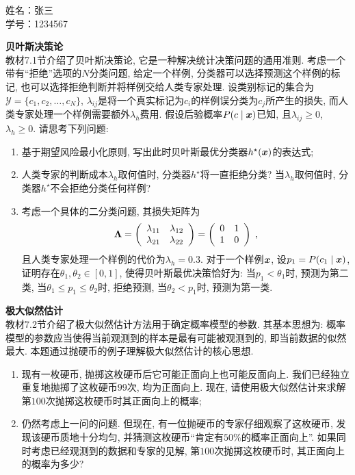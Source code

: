 \documentclass[answers]{exam}  %
\begin{document}
\noindent 
姓名：张三 \\
学号：1234567 \\
\begin{questions}
\question [20] \textbf{贝叶斯决策论} \\
教材7.1节介绍了贝叶斯决策论, 它是一种解决统计决策问题的通用准则. 考虑一个带有“拒绝”选项的$N$分类问题, 给定一个样例, 分类器可以选择预测这个样例的标记, 也可以选择拒绝判断并将样例交给人类专家处理. 设类别标记的集合为$\mathcal{Y}=\{c_1,c_2,\ldots,c_N\}$, $\lambda_{ij}$是将一个真实标记为$c_i$的样例误分类为$c_j$所产生的损失, 而人类专家处理一个样例需要额外$\lambda_{h}$费用. 假设后验概率$P(c\mid{\boldsymbol{x}})$已知, 且$\lambda_{ij}\geq 0$, $\lambda_{h}\geq 0$. 请思考下列问题:
\begin{enumerate}
	\item 基于期望风险最小化原则, 写出此时贝叶斯最优分类器$h^\star({\boldsymbol{x}})$的表达式;
	\item 人类专家的判断成本$\lambda_{h}$取何值时, 分类器$h^\star$将一直拒绝分类? 当$\lambda_{h}$取何值时, 分类器$h^\star$不会拒绝分类任何样例?
	\item 考虑一个具体的二分类问题, 其损失矩阵为
	\begin{equation}
		\boldsymbol{\Lambda}=\left(\begin{array}{cc}
			\lambda_{11} & \lambda_{12} \\
			\lambda_{21} & \lambda_{22} \end{array}\right)=\left(\begin{array}{cc}
			0 & 1 \\
			1 & 0 \end{array}\right)\;,
	\label{ch7_eq:cost_matrix}
	\end{equation}
	且人类专家处理一个样例的代价为$\lambda_{h}=0.3$. 对于一个样例${\boldsymbol{x}}$, 设$p_1=P(c_1\mid{\boldsymbol{x}})$, 证明存在$\theta_1,\theta_2\in[0,1]$, 使得贝叶斯最优决策恰好为: 当$p_1<\theta_1$时, 预测为第二类, 当$\theta_1\leq p_1\leq \theta_2$时, 拒绝预测, 当$\theta_2<p_1$时, 预测为第一类.
\end{enumerate}

\begin{solution}
\end{solution}

\question [20] \textbf{极大似然估计} \\
教材7.2节介绍了极大似然估计方法用于确定概率模型的参数. 其基本思想为: 概率模型的参数应当使得当前观测到的样本是最有可能被观测到的, 即当前数据的似然最大. 本题通过抛硬币的例子理解极大似然估计的核心思想. 
\begin{enumerate}
	\item 现有一枚硬币, 抛掷这枚硬币后它可能正面向上也可能反面向上. 我们已经独立重复地抛掷了这枚硬币$99$次, 均为正面向上. 现在, 请使用极大似然估计来求解第$100$次抛掷这枚硬币时其正面向上的概率;
	\item 仍然考虑上一问的问题. 但现在, 有一位抛硬币的专家仔细观察了这枚硬币, 发现该硬币质地十分均匀, 并猜测这枚硬币“肯定有$50\%$的概率正面向上”. 如果同时考虑已经观测到的数据和专家的见解, 第$100$次抛掷这枚硬币时, 其正面向上的概率为多少?
	

\end{enumerate}
\end{questions}
\end{document}
